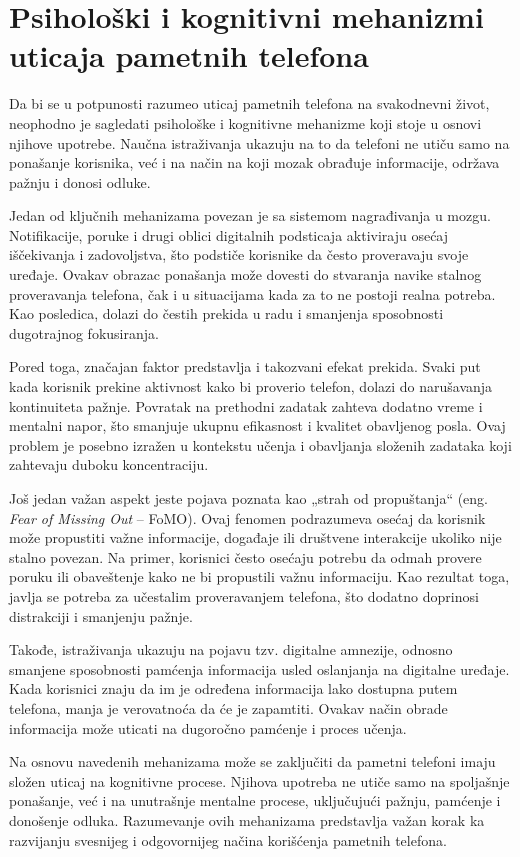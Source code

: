\documentclass{article}
\begin{document}
\section{Psihološki i kognitivni mehanizmi uticaja pametnih telefona}

Da bi se u potpunosti razumeo uticaj pametnih telefona na svakodnevni život, neophodno je sagledati psihološke i kognitivne mehanizme koji stoje u osnovi njihove upotrebe. Naučna istraživanja ukazuju na to da telefoni ne utiču samo na ponašanje korisnika, već i na način na koji mozak obrađuje informacije, održava pažnju i donosi odluke.

Jedan od ključnih mehanizama povezan je sa sistemom nagrađivanja u mozgu. Notifikacije, poruke i drugi oblici digitalnih podsticaja aktiviraju osećaj iščekivanja i zadovoljstva, što podstiče korisnike da često proveravaju svoje uređaje. Ovakav obrazac ponašanja može dovesti do stvaranja navike stalnog proveravanja telefona, čak i u situacijama kada za to ne postoji realna potreba. Kao posledica, dolazi do čestih prekida u radu i smanjenja sposobnosti dugotrajnog fokusiranja.

Pored toga, značajan faktor predstavlja i takozvani efekat prekida. Svaki put kada korisnik prekine aktivnost kako bi proverio telefon, dolazi do narušavanja kontinuiteta pažnje. Povratak na prethodni zadatak zahteva dodatno vreme i mentalni napor, što smanjuje ukupnu efikasnost i kvalitet obavljenog posla. Ovaj problem je posebno izražen u kontekstu učenja i obavljanja složenih zadataka koji zahtevaju duboku koncentraciju.

Još jedan važan aspekt jeste pojava poznata kao „strah od propuštanja“ (eng. \textit{Fear of Missing Out} – FoMO). Ovaj fenomen podrazumeva osećaj da korisnik može propustiti važne informacije, događaje ili društvene interakcije ukoliko nije stalno povezan. Na primer, korisnici često osećaju potrebu da odmah provere poruku ili obaveštenje kako ne bi propustili važnu informaciju. Kao rezultat toga, javlja se potreba za učestalim proveravanjem telefona, što dodatno doprinosi distrakciji i smanjenju pažnje.

Takođe, istraživanja ukazuju na pojavu tzv. digitalne amnezije, odnosno smanjene sposobnosti pamćenja informacija usled oslanjanja na digitalne uređaje. Kada korisnici znaju da im je određena informacija lako dostupna putem telefona, manja je verovatnoća da će je zapamtiti. Ovakav način obrade informacija može uticati na dugoročno pamćenje i proces učenja.

Na osnovu navedenih mehanizama može se zaključiti da pametni telefoni imaju složen uticaj na kognitivne procese. Njihova upotreba ne utiče samo na spoljašnje ponašanje, već i na unutrašnje mentalne procese, uključujući pažnju, pamćenje i donošenje odluka. Razumevanje ovih mehanizama predstavlja važan korak ka razvijanju svesnijeg i odgovornijeg načina korišćenja pametnih telefona.
\end{document}
